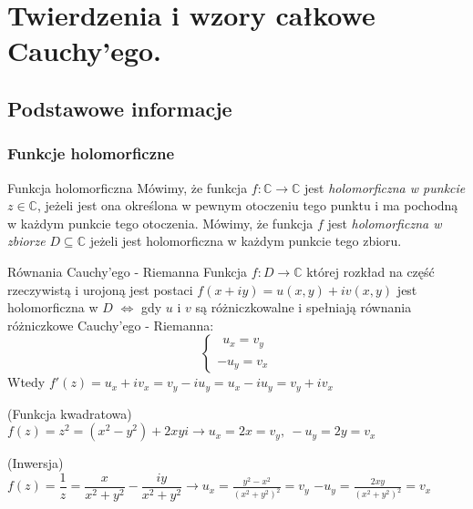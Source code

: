 \chapter{Twierdzenia i wzory całkowe Cauchy'ego.}

\section{Podstawowe informacje}

\subsection{Funkcje holomorficzne}

\begin{df}{Funkcja holomorficzna}
Mówimy, że funkcja $f:\mathbb{C}\rightarrow \mathbb{C}$ jest \textit{holomorficzna w punkcie} $z\in \mathbb{C}$, jeżeli jest ona określona w pewnym otoczeniu tego punktu i ma pochodną w każdym punkcie tego otoczenia. Mówimy, że funkcja $f$ jest \textit{holomorficzna w zbiorze} $D\subseteq \mathbb{C}$ jeżeli jest holomorficzna w każdym punkcie tego zbioru.
\end{df}

\begin{df}{Równania Cauchy'ego - Riemanna}
Funkcja $f:D\rightarrow\mathbb{C}$ której rozkład na część rzeczywistą i urojoną jest postaci $f(x+iy)=u(x,y)+iv(x,y)$ jest holomorficzna w $D$ $\Leftrightarrow$ gdy $u$ i $v$ są różniczkowalne i spełniają równania różniczkowe Cauchy'ego - Riemanna:
\begin{displaymath}
\left\{\begin{array}{ll}
\ \ \displaystyle{u_x=v_y}
\\
\\\displaystyle{-u_y=v_x}
\end{array} \right.
\end{displaymath}
Wtedy $f'(z)=u_x+iv_x=v_y-iu_y=u_x-iu_y=v_y+iv_x$
\end{df}

\begin{przyk}{(Funkcja kwadratowa)}\\
$f(z)=z^2=(x^2-y^2)+2xyi\rightarrow u_x=2x=v_y,\ -u_y=2y=v_x$
\end{przyk}

\begin{przyk}{(Inwersja)}\\
$f(z)=\dfrac{1}{z}=\dfrac{x}{x^2+y^2}-\dfrac{iy}{x^2+y^2}\rightarrow u_x=\frac{y^2-x^2}{(x^2+y^2)^2}=v_y$
$-u_y=\frac{2xy}{(x^2+y^2)^2}=v_x$
\end{przyk}


